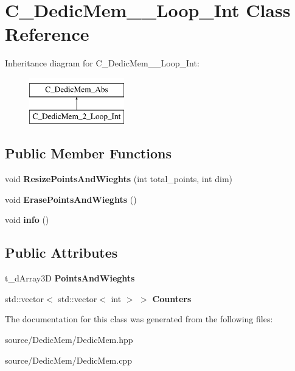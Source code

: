 \hypertarget{class_c___dedic_mem__2___loop___int}{\section{C\-\_\-\-Dedic\-Mem\-\_\-\_\-\-Loop\-\_\-\-Int Class Reference}
\label{class_c___dedic_mem__2___loop___int}
}
Inheritance diagram for C\-\_\-\-Dedic\-Mem\-\_\-\_\-\-Loop\-\_\-\-Int\-:\begin{figure}[H]
\begin{center}
\leavevmode
\includegraphics[height=2.000000cm]{class_c___dedic_mem__2___loop___int}
\end{center}
\end{figure}
\subsection*{Public Member Functions}
\begin{DoxyCompactItemize}
\item 
\hypertarget{class_c___dedic_mem__2___loop___int_ab6e66c7c1823c85d3529e9594aebdb29}{void {\bfseries Resize\-Points\-And\-Wieghts} (int total\-\_\-points, int dim)}\label{class_c___dedic_mem__2___loop___int_ab6e66c7c1823c85d3529e9594aebdb29}

\item 
\hypertarget{class_c___dedic_mem__2___loop___int_a3ecf4e20ebcaae850e0965a48378f318}{void {\bfseries Erase\-Points\-And\-Wieghts} ()}\label{class_c___dedic_mem__2___loop___int_a3ecf4e20ebcaae850e0965a48378f318}

\item 
\hypertarget{class_c___dedic_mem__2___loop___int_a9dfbb69210500ddc1050fbbe9e7f361c}{void {\bfseries info} ()}\label{class_c___dedic_mem__2___loop___int_a9dfbb69210500ddc1050fbbe9e7f361c}

\end{DoxyCompactItemize}
\subsection*{Public Attributes}
\begin{DoxyCompactItemize}
\item 
\hypertarget{class_c___dedic_mem__2___loop___int_ad294710fd059b983eb0f023c96c4a4ec}{t\-\_\-d\-Array3\-D {\bfseries Points\-And\-Wieghts}}\label{class_c___dedic_mem__2___loop___int_ad294710fd059b983eb0f023c96c4a4ec}

\item 
\hypertarget{class_c___dedic_mem__2___loop___int_ad150b718bf77284f7dd1484775668773}{std\-::vector$<$ std\-::vector$<$ int $>$ $>$ {\bfseries Counters}}\label{class_c___dedic_mem__2___loop___int_ad150b718bf77284f7dd1484775668773}

\end{DoxyCompactItemize}


The documentation for this class was generated from the following files\-:\begin{DoxyCompactItemize}
\item 
source/\-Dedic\-Mem/Dedic\-Mem.\-hpp\item 
source/\-Dedic\-Mem/Dedic\-Mem.\-cpp\end{DoxyCompactItemize}
